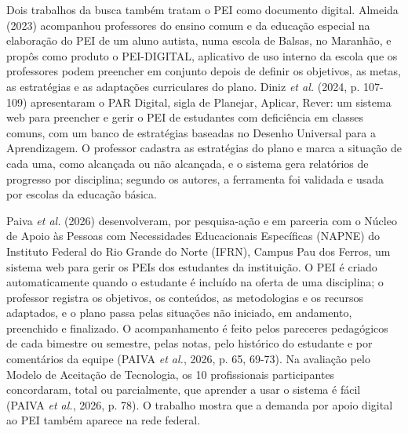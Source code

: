 Dois trabalhos da busca também tratam o PEI como documento digital. Almeida (2023) acompanhou professores do ensino comum e da educação especial na elaboração do PEI de um aluno autista, numa escola de Balsas, no Maranhão, e propôs como produto o PEI-DIGITAL, aplicativo de uso interno da escola que os professores podem preencher em conjunto depois de definir os objetivos, as metas, as estratégias e as adaptações curriculares do plano. Diniz \textit{et al.} (2024, p. 107-109) apresentaram o PAR Digital, sigla de Planejar, Aplicar, Rever: um sistema web para preencher e gerir o PEI de estudantes com deficiência em classes comuns, com um banco de estratégias baseadas no Desenho Universal para a Aprendizagem. O professor cadastra as estratégias do plano e marca a situação de cada uma, como alcançada ou não alcançada, e o sistema gera relatórios de progresso por disciplina; segundo os autores, a ferramenta foi validada e usada por escolas da educação básica.

Paiva \textit{et al.} (2026) desenvolveram, por pesquisa-ação e em parceria com o Núcleo de Apoio às Pessoas com Necessidades Educacionais Específicas (NAPNE) do Instituto Federal do Rio Grande do Norte (IFRN), Campus Pau dos Ferros, um sistema web para gerir os PEIs dos estudantes da instituição. O PEI é criado automaticamente quando o estudante é incluído na oferta de uma disciplina; o professor registra os objetivos, os conteúdos, as metodologias e os recursos adaptados, e o plano passa pelas situações não iniciado, em andamento, preenchido e finalizado. O acompanhamento é feito pelos pareceres pedagógicos de cada bimestre ou semestre, pelas notas, pelo histórico do estudante e por comentários da equipe (PAIVA \textit{et al.}, 2026, p. 65, 69-73). Na avaliação pelo Modelo de Aceitação de Tecnologia, os 10 profissionais participantes concordaram, total ou parcialmente, que aprender a usar o sistema é fácil (PAIVA \textit{et al.}, 2026, p. 78). O trabalho mostra que a demanda por apoio digital ao PEI também aparece na rede federal.

